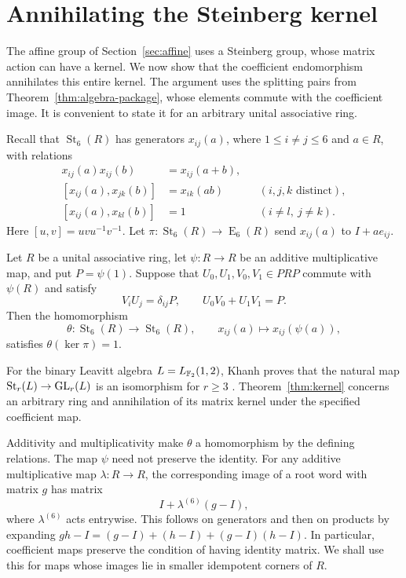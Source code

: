 \section{Annihilating the Steinberg kernel}\label{sec:kernel}

The affine group of Section~\ref{sec:affine} uses a Steinberg group,
whose matrix action can have a kernel.  We now show that the coefficient
endomorphism annihilates this entire kernel. The argument uses the
splitting pairs from Theorem~\ref{thm:algebra-package}, whose elements
commute with the coefficient image.
It is convenient to state it for an arbitrary unital associative ring.

Recall that $\operatorname{St}_6(R)$ has generators $x_{ij}(a)$, where
$1\leq i\ne j\leq6$ and $a\in R$, with relations
\begin{align}
 x_{ij}(a)x_{ij}(b)&=x_{ij}(a+b),\label{eq:kernel-additive}\\
 [x_{ij}(a),x_{jk}(b)]&=x_{ik}(ab)
       &&(i,j,k\text{ distinct}),\label{eq:kernel-chain}\\
 [x_{ij}(a),x_{kl}(b)]&=1
       &&(i\ne l,\ j\ne k).\label{eq:kernel-distant}
\end{align}
Here $[u,v]=uvu^{-1}v^{-1}$.  Let
$\pi:\operatorname{St}_6(R)\to\operatorname{E}_6(R)$ send
$x_{ij}(a)$ to $I+ae_{ij}$.

\begin{theorem}\label{thm:kernel}
Let $R$ be a unital associative ring, let $\psi:R\to R$ be an additive
multiplicative map, and put $P=\psi(1)$.  Suppose that
$U_0,U_1,V_0,V_1\in PRP$ commute with $\psi(R)$ and satisfy
\[
 V_iU_j=\delta_{ij}P,\qquad U_0V_0+U_1V_1=P.
\]
Then the homomorphism
\[
 \theta:\operatorname{St}_6(R)\longrightarrow\operatorname{St}_6(R),
 \qquad x_{ij}(a)\longmapsto x_{ij}(\psi(a)),
\]
satisfies $\theta(\ker\pi)=1$.
\end{theorem}

For the binary Leavitt algebra $L=L_{\mathbb F_2}(1,2)$, Khanh proves that
the natural map $\operatorname{St}_r(L)\to\mathrm{GL}_r(L)$ is an isomorphism for
$r\ge3$ \cite[Theorem~5.4]{Khanh2026Leavitt}.
Theorem~\ref{thm:kernel} concerns an arbitrary ring and annihilation
of its matrix kernel under the specified coefficient map.

Additivity and multiplicativity make $\theta$ a homomorphism by the
defining relations.  The map $\psi$ need not preserve the identity.
For any additive
multiplicative map $\lambda:R\to R$, the corresponding image of a root
word with matrix $g$ has matrix
\begin{equation}\label{eq:kernel-nonunital}
 I+\lambda^{(6)}(g-I),
\end{equation}
where $\lambda^{(6)}$ acts entrywise.  This follows on generators and
then on products by expanding $gh-I=(g-I)+(h-I)+(g-I)(h-I)$.
In particular, coefficient maps preserve the condition of having
identity matrix.  We shall use this for maps whose images lie in
smaller idempotent corners of $R$.

